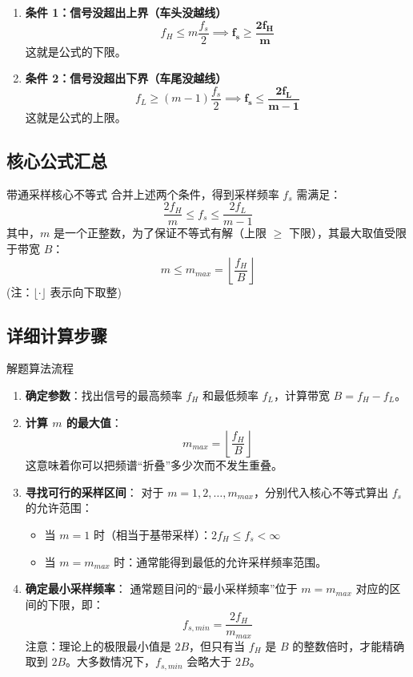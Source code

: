 \begin{enumerate}
    \item \textbf{条件 1：信号没超出上界（车头没越线）}
    \[ f_H \le m\frac{f_s}{2} \implies \boldsymbol{f_s \ge \frac{2f_H}{m}} \]
    这就是公式的下限。
    
    \item \textbf{条件 2：信号没超出下界（车尾没越线）}
    \[ f_L \ge (m-1)\frac{f_s}{2} \implies \boldsymbol{f_s \le \frac{2f_L}{m-1}} \]
    这就是公式的上限。
\end{enumerate}

\subsection{核心公式汇总}

\begin{alertbox}{带通采样核心不等式}
    合并上述两个条件，得到采样频率 $f_s$ 需满足：
    \[ \boxed{ \frac{2f_H}{m} \le f_s \le \frac{2f_L}{m-1} } \]
    其中，$m$ 是一个正整数，为了保证不等式有解（上限 $\ge$ 下限），其最大取值受限于带宽 $B$：
    \[ m \le m_{max} = \left\lfloor \frac{f_H}{B} \right\rfloor \]
    (注：$\lfloor \cdot \rfloor$ 表示向下取整)
\end{alertbox}

\subsection{详细计算步骤}

\begin{examplebox}{解题算法流程}
\begin{enumerate}
    \item \textbf{确定参数}：找出信号的最高频率 $f_H$ 和最低频率 $f_L$，计算带宽 $B = f_H - f_L$。
    
    \item \textbf{计算 $m$ 的最大值}：
    \[ m_{max} = \left\lfloor \frac{f_H}{B} \right\rfloor \]
    这意味着你可以把频谱“折叠”多少次而不发生重叠。
    
    \item \textbf{寻找可行的采样区间}：
    对于 $m = 1, 2, \dots, m_{max}$，分别代入核心不等式算出 $f_s$ 的允许范围：
    \begin{itemize}
        \item 当 $m=1$ 时（相当于基带采样）：$2f_H \le f_s < \infty$
        \item 当 $m=m_{max}$ 时：通常能得到最低的允许采样频率范围。
    \end{itemize}
    
    \item \textbf{确定最小采样频率}：
    通常题目问的“最小采样频率”位于 $m = m_{max}$ 对应的区间的下限，即：
    \[ f_{s,min} = \frac{2f_H}{m_{max}} \]
    \small{注意：理论上的极限最小值是 $2B$，但只有当 $f_H$ 是 $B$ 的整数倍时，才能精确取到 $2B$。大多数情况下，$f_{s,min}$ 会略大于 $2B$。}
\end{enumerate}
\end{examplebox}